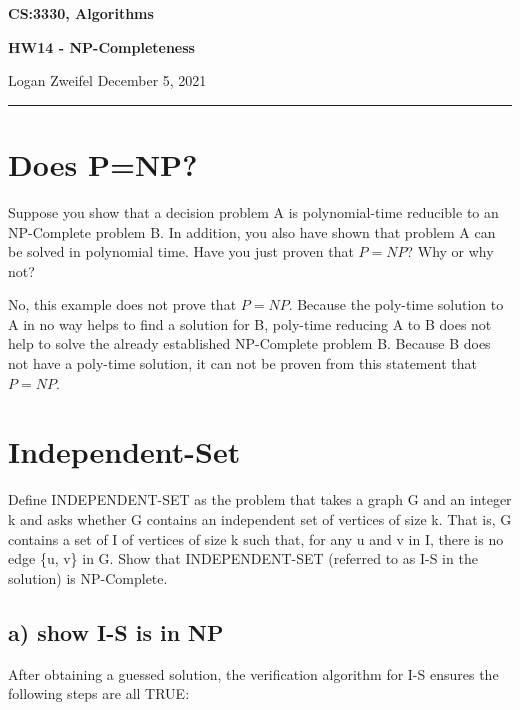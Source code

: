 \documentclass[11pt]{article}
\begin{document}
\thispagestyle{empty}

\begin{center}
\bf\large CS:3330, Algorithms
\end{center}

\begin{center}
\bf\large HW14 - NP-Completeness  %
\end{center}

\noindent
Logan Zweifel     %
\hfill
December 5, 2021           %

\noindent
\rule{\textwidth}{1pt}

\medskip


\section{Does P=NP?}
Suppose you show that a decision problem A is polynomial-time reducible to an NP-Complete problem B. In addition, you also have shown that problem A can be solved in polynomial time. Have you just proven that $P=NP$? Why or why not?

\bigskip
\bigskip

No, this example does not prove that $P=NP$. Because the poly-time solution to A in no way helps to find a solution for B, poly-time reducing A to B does not help to solve the already established NP-Complete problem B. Because B does not have a poly-time solution, it can not be proven from this statement that $P=NP$.


\bigskip
\bigskip

\section{Independent-Set}
Define INDEPENDENT-SET as the problem that takes a graph G and an integer k and asks whether G contains an independent set of vertices of size k. That is, G contains a set of I of vertices of size k such that, for any u and v in I, there is no edge \{u, v\} in G. Show that INDEPENDENT-SET (referred to as I-S in the solution) is NP-Complete.\\

\bigskip
\subsection*{a) show I-S is in NP}
\noindent After obtaining a guessed solution, the verification algorithm for I-S ensures the following steps are all TRUE:
\end{document}
